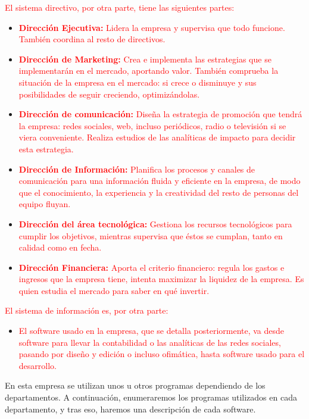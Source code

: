 \documentclass{article}
\begin{document}
\textcolor{Red}{El sistema directivo, por otra parte, tiene las siguientes partes:}

\begin{itemize}
\item \textcolor{Red}{\textbf{Dirección Ejecutiva:} Lidera la empresa y supervisa que todo funcione. También coordina al resto de directivos.}
\item \textcolor{Red}{\textbf{Dirección de Marketing:} Crea e implementa las estrategias que se implementarán en el mercado, aportando valor. También comprueba la situación de la empresa en el mercado: si crece o disminuye y sus posibilidades de seguir creciendo, optimizándolas.}
\item \textcolor{Red}{\textbf{Dirección de comunicación:} Diseña la estrategia de promoción que tendrá la empresa: redes sociales, web, incluso periódicos, radio o televisión si se viera conveniente. Realiza estudios de las analíticas de impacto para decidir esta estrategia.}
\item \textcolor{Red}{\textbf{Dirección de Información:} Planifica los procesos y canales de comunicación para una información fluida y eficiente en la empresa, de modo que el conocimiento, la experiencia y la creatividad del resto de personas del equipo fluyan.}
\item \textcolor{Red}{\textbf{Dirección del área tecnológica:} Gestiona los recursos tecnológicos para cumplir los objetivos, mientras supervisa que éstos se cumplan, tanto en calidad como en fecha.}
\item \textcolor{Red}{\textbf{Dirección Financiera:} Aporta el criterio financiero: regula los gastos e ingresos que la empresa tiene, intenta maximizar la liquidez de la empresa. Es quien estudia el mercado para saber en qué invertir.}
\end{itemize}

\textcolor{Red}{El sistema de información es, por otra parte:}

\begin{itemize}
\item \textcolor{Red}{El software usado en la empresa, que se detalla posteriormente, va desde software para llevar la contabilidad o las analíticas de las redes sociales, pasando por diseño y edición o incluso ofimática, hasta software usado para el desarrollo.}
\end{itemize}

En esta empresa se utilizan unos u otros programas dependiendo de los departamentos. A continuación, enumeraremos los programas utilizados en cada departamento, y tras eso, haremos una descripción de cada software.  
\end{document}
